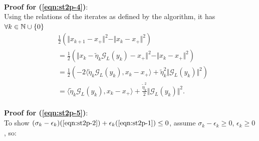 \documentclass[12pt]{article}
\begin{document}
        \\
        \textbf{Proof for (\ref*{eqn:st2p-4})}:
        \\
        Using the relations of the iterates as defined by the algorithm, it has $\forall k \in \mathbb N\cup \{0\}$
        \begin{align*}
            & \frac{1}{2} 
            \left(
                \Vert x_{k + 1} - x_+\Vert^2
                - 
                \Vert x_k - x_+\Vert^2 
            \right)
            \\
            &=
            \frac{1}{2} 
            \left(
                \Vert x_k - \tilde \eta_k\mathcal G_L (y_k) - x_+ \Vert^2 
                - 
                \Vert x_k - x_+\Vert^2
            \right)
            \\
            &= 
            \frac{1}{2}\left(
                -2\langle \tilde \eta_k \mathcal G_L(y_k), x_k - x_+\rangle
                + 
                \tilde \eta_k^2 \Vert \mathcal G_L(y_k)\Vert^2
            \right)
            \\
            &= 
            \langle \tilde \eta_k \mathcal G_L(y_k), x_k - x_+\rangle
                + 
            \frac{\tilde \eta_k^2}{2} \Vert \mathcal G_L(y_k)\Vert^2. 
        \end{align*}
        \\
        \textbf{Proof for (\ref*{eqn:st2p-5})}:
        \\
        To show $(\sigma_k - \epsilon_k)(\ref*{eqn:st2p-2}) + \epsilon_k(\ref*{eqn:st2p-1}) \le 0$, assume $\sigma_k - \epsilon_k \ge 0$, $\epsilon_k \ge 0$, so: 
\end{document}
